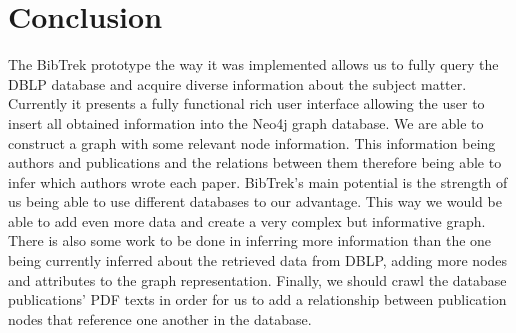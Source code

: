 \documentclass[twocolumn]{article}
\begin{document}
\section{Conclusion}
The BibTrek prototype the way it was implemented allows us to fully query the DBLP database and acquire diverse information about the subject matter. Currently it presents a fully functional rich user interface allowing the user to insert all obtained information into the Neo4j graph database. We are able to construct a graph with some relevant node information. This information being authors and publications and the relations between them therefore being able to infer which authors wrote each paper. BibTrek's main potential is the strength of us being able to use different databases to our advantage. This way we would be able to add even more data and create a very complex but informative graph. There is also some work to be done in inferring more information than the one being currently inferred about the retrieved data from DBLP, adding more nodes and attributes to the graph representation. Finally, we should crawl the database publications' PDF texts in order for us to add a relationship between publication nodes that reference one another in the database.
\end{document}
